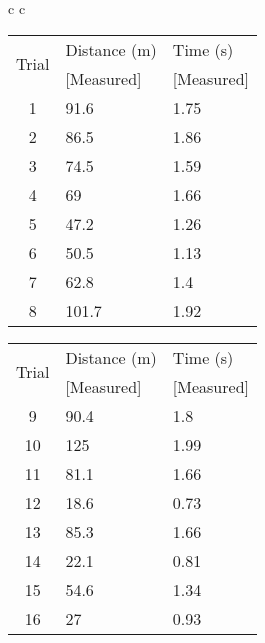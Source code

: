 \documentclass{article}
\begin{document}
\begin{center}
    \begin{tabular}{c c}
        \begin{tabular}{ | c l l | }
            \hline
            \multirow{2}{2em}{Trial} & Distance (m) & Time (s)\\
                                 & [Measured] & [Measured]\\
            \hline
            1 & 91.6  & 1.75\\
            2 & 86.5  & 1.86\\
            3 & 74.5  & 1.59\\
            4 & 69    & 1.66\\
            5 & 47.2  & 1.26\\
            6 & 50.5  & 1.13\\
            7 & 62.8  & 1.4\\
            8 & 101.7 &	1.92\\
            \hline
        \end{tabular}

        \begin{tabular}{ | c l l | }
            \hline
            \multirow{2}{2em}{Trial} & Distance (m) & Time (s)\\
                                 & [Measured] & [Measured]\\
            \hline
            9 & 90.4  & 1.8\\
            10 & 125  & 1.99\\
            11 & 81.1 & 1.66\\
            12 & 18.6 & 0.73\\
            13 & 85.3 & 1.66\\
            14 & 22.1 & 0.81\\
            15 & 54.6 & 1.34\\
            16 & 27   & 0.93\\
            \hline
        \end{tabular}
    \end{tabular}
\end{center}
\end{document}
